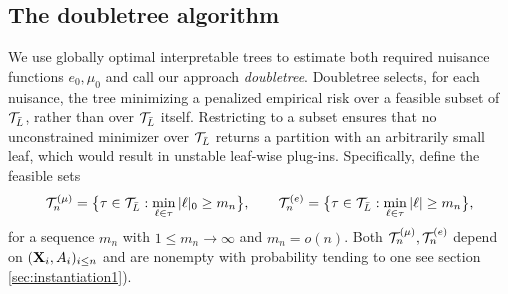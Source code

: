 \documentclass[12pt]{article}
\begin{document}
\subsection{The doubletree algorithm}
We use globally optimal interpretable trees to estimate both required nuisance functions $e_0,\mu_0$ and call our approach \emph{doubletree}. Doubletree selects, for each nuisance, the tree minimizing a penalized empirical risk over a feasible subset of $\mathcal{T}_{\bar{L}}$, rather than over $\mathcal{T}_{\bar{L}}$ itself. Restricting to a subset ensures that no unconstrained minimizer over $\mathcal{T}_{\bar{L}}$ returns a partition with an arbitrarily small leaf, which would result in unstable leaf-wise plug-ins. Specifically, define the feasible sets
\begin{equation}\label{eq:feasible}
  \mathcal{T}^{(\mu)}_n=\bigl\{\tau\in\mathcal{T}_{\bar{L}}: \min_{\ell \in \tau} |\ell|_0 \geq m_n\bigr\}, \qquad 
    \mathcal{T}^{(e)}_n=\bigl\{\tau\in\mathcal{T}_{\bar{L}}: \min_{\ell \in \tau} |\ell| \geq m_n\bigr\},
\end{equation}
for a sequence $m_n$ with $1\le m_n\to\infty$ and $m_n=o(n)$. Both $\mathcal{T}^{(\mu)}_n,\mathcal{T}^{(e)}_n$ depend on $(\mathbf{X}_i,A_i)_{i\le n}$ and are nonempty with probability tending to one see section \ref{sec:instantiation1}).
\end{document}
